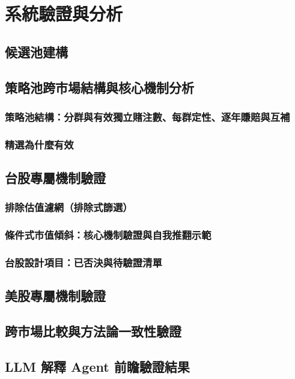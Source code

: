 \chapter{系統驗證與分析}\label{ch:validation}

\section{候選池建構}\label{sec:pool}
\section{策略池跨市場結構與核心機制分析}\label{sec:structure}
\subsection{策略池結構：分群與有效獨立賭注數、每群定性、逐年賺賠與互補}
\subsection{精選為什麼有效}
\section{台股專屬機制驗證}\label{sec:tw}
\subsection{排除估值濾網（排除式篩選）}
\subsection{條件式市值傾斜：核心機制驗證與自我推翻示範}
\subsection{台股設計項目：已否決與待驗證清單}
\section{美股專屬機制驗證}\label{sec:us}
\section{跨市場比較與方法論一致性驗證}\label{sec:cross}
\section{LLM 解釋 Agent 前瞻驗證結果}\label{sec:llm-validation}
